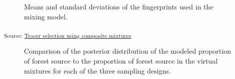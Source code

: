 \documentclass[
  number]{elsarticle}
\begin{document}
\begin{figure}[H]


\caption{\label{fig-sdplot-test}Means and standard deviations of the
fingerprints used in the mixing model.}

\end{figure}%

\textsubscript{Source:
\href{https://alex-koiter.github.io/sampling-design-manuscript/notebooks/Tracer_selection-preview.html\#cell-fig-sdplot-test}{Tracer
selection using composite mixtures}}

\begin{figure}[H]


\caption{\label{fig-unmixing-plot}Comparison of the posterior
distribution of the modeled proportion of forest source to the
proportion of forest source in the virtual mixtures for each of the
three sampling designs.}

\end{figure}%
\end{document}
